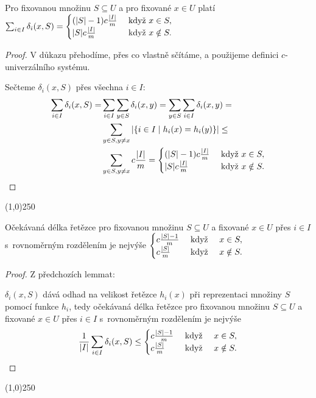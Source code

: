 \documentclass[a4paper,12pt]{article}
\newenvironment{myproof}{
  \begin{proof}
    
  }{
  \end{proof}
  \begin{center}
   \line(1,0){250}
   \end{center}
  }
\begin{document}
\begin{lemma}
    Pro fixovanou množinu $S\subseteq U$ a pro fixované $
    x\in U$ platí $\sum_{i\in I}\delta_i(x,S)=\begin{cases} (|S|-1)c\frac {|I|}m&\text{\rm\ když }
    x\in S,\\
    |S|c\frac {|I|}m&\text{\rm\ když }x\notin S.\end{cases}$
\end{lemma}
\begin{myproof}
    V důkazu  přehodíme, přes co vlastně sčítáme, a použijeme definici $c$-univerzálního systému.
    
Sečteme
$\delta_i(x,S)$ přes všechna $i\in I$:
\begin{align*}\sum_{i\in I}\delta_i(x,S)=&\sum_{i\in I}\sum_{y\in S}\delta_
i(x,y)=\sum_{y\in S}\sum_{i\in I}\delta_i(x,y)=\\
&\sum_{y\in S,y\ne x}|\{i\in I\mid h_i(x)=h_i(y)\}|\le\\
&\sum_{y\in S,y\ne x}c\frac {|I|}m=\begin{cases} (|S|-1)c\frac {|I|}m&\text{\rm\ když }
x\in S,\\
|S|c\frac {|I|}m&\text{\rm\ když }x\notin S.\end{cases} \end{align*}
\end{myproof}

\begin{lemma}
    Očekávaná délka řetězce pro fixovanou množinu  
    $S\subseteq U$ a fixované $x\in U$ přes $i\in I$ s~rovnoměrným 
    rozdělením je nejvýše
    $\begin{cases} c\frac {|S|-1}m&\text{\rm\ když }
    \quad x\in S,\\
    c\frac {|S|}m&\text{\rm\ když }\quad x\notin S.\end{cases} $ 
\end{lemma}

\begin{myproof}
    Z předchozích lemmat:
    
    $\delta_i(x,S)$ dává odhad na velikost řetězce $
    h_i(x)$ při 
    repre\-zentaci množiny $S$ pomocí funkce $h_i$, tedy 
    očekávaná délka řetězce pro fixovanou množinu  
    $S\subseteq U$ a fixované $x\in U$ přes $i\in I$ s~rovnoměrným 
    rozdělením je nejvýše
    $$\frac 1{|I|}\sum_{i\in I}\delta_i(x,S)\le\begin{cases} c\frac {|S|-1}m&\text{\rm\ když }
    \quad x\in S,\\
    c\frac {|S|}m&\text{\rm\ když }\quad x\notin S.\end{cases} $$
\end{myproof}
\end{document}
